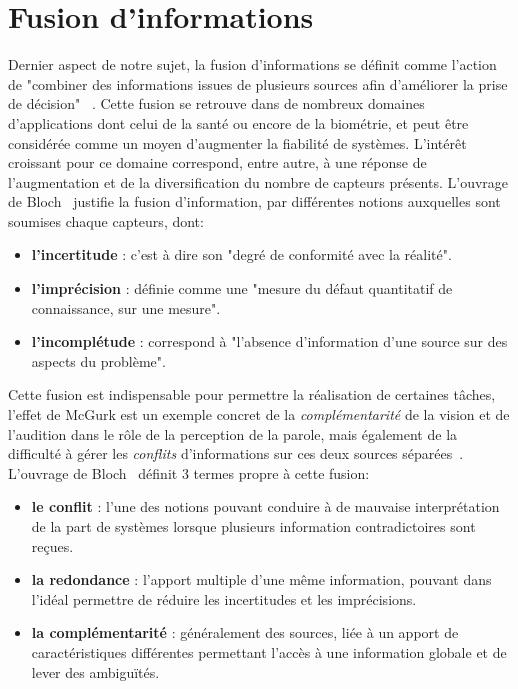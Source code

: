 \clearpage

\section{Fusion d’informations}
\label{sec:fusion_information}
Dernier aspect de notre sujet, la fusion d’informations se définit comme l’action de "combiner des informations issues de plusieurs sources afin d’améliorer la prise de décision" ~\cite{Bloch2003}. Cette fusion se retrouve dans de nombreux domaines d'applications dont celui de la santé ou encore de la biométrie, et peut être considérée comme un moyen d'augmenter la fiabilité de systèmes. L'intérêt croissant pour ce domaine correspond, entre autre, à une réponse de l'augmentation et de la diversification du nombre de capteurs présents. L'ouvrage de Bloch~\cite{Bloch2003} justifie la fusion d'information, par différentes notions auxquelles sont soumises chaque capteurs, dont:
\begin{itemize}
    \item \textbf{l'incertitude} : c'est à dire son "degré de conformité avec la réalité".
    \item \textbf{l'imprécision} : définie comme une "mesure du défaut quantitatif de connaissance, sur une mesure".
    \item \textbf{l'incomplétude} : correspond à "l'absence d'information d'une source sur des aspects du problème".
\end{itemize}\par

Cette fusion est indispensable pour permettre la réalisation de certaines tâches, l'effet de McGurk est un exemple concret de la \textit{complémentarité} de la vision et de l'audition dans le rôle de la perception de la parole, mais également de la difficulté à gérer les \textit{conflits} d'informations sur ces deux sources séparées~\cite{Mcgurk1976}. L'ouvrage de Bloch~\cite{Bloch2003} définit 3 termes propre à cette fusion:
\begin{itemize}
    \item \textbf{le conflit} : l'une des notions pouvant conduire à de mauvaise interprétation de la part de systèmes lorsque plusieurs information contradictoires sont reçues.
    \item \textbf{la redondance} : l'apport multiple d'une même information, pouvant dans l'idéal permettre de réduire les incertitudes et les imprécisions.
    \item \textbf{la complémentarité} : généralement des sources, liée à un apport de caractéristiques différentes permettant l'accès à une information globale et de lever des ambiguïtés.
\end{itemize}\par

